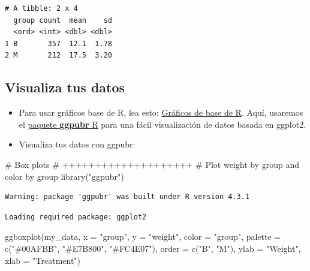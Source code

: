\documentclass[
  letterpaper,
  DIV=11,
  numbers=noendperiod]{scrartcl}
\newenvironment{Shaded}{\begin{snugshade}}{\end{snugshade}}
\newcommand{\AttributeTok}[1]{\textcolor[rgb]{0.40,0.45,0.13}{#1}}
\newcommand{\CommentTok}[1]{\textcolor[rgb]{0.37,0.37,0.37}{#1}}
\newcommand{\FunctionTok}[1]{\textcolor[rgb]{0.28,0.35,0.67}{#1}}
\newcommand{\NormalTok}[1]{\textcolor[rgb]{0.00,0.23,0.31}{#1}}
\newcommand{\StringTok}[1]{\textcolor[rgb]{0.13,0.47,0.30}{#1}}
\begin{document}
\begin{verbatim}
# A tibble: 2 x 4
  group count  mean    sd
  <ord> <int> <dbl> <dbl>
1 B       357  12.1  1.78
2 M       212  17.5  3.20
\end{verbatim}

\hypertarget{visualiza-tus-datos}{%
\subsection{Visualiza tus datos}\label{visualiza-tus-datos}}

\begin{itemize}
\item
  Para usar gráficos base de R, lea esto:
  \href{http://www.sthda.com/english/wiki/r-base-graphs}{Gráficos de
  base de R}. Aquí, usaremos el
  \href{http://www.sthda.com/english/wiki/ggpubr-r-package-ggplot2-based-publication-ready-plots}{paquete
  \textbf{ggpubr} R} para una fácil visualización de datos basada en
  ggplot2.
\item
  Visualiza tus datos con ggpubr:
\end{itemize}

\begin{Shaded}
\begin{Highlighting}[]
\CommentTok{\# Box plots}
\CommentTok{\# ++++++++++++++++++++}
\CommentTok{\# Plot weight by group and color by group}
\FunctionTok{library}\NormalTok{(}\StringTok{"ggpubr"}\NormalTok{)}
\end{Highlighting}
\end{Shaded}

\begin{verbatim}
Warning: package 'ggpubr' was built under R version 4.3.1
\end{verbatim}

\begin{verbatim}
Loading required package: ggplot2
\end{verbatim}

\begin{Shaded}
\begin{Highlighting}[]
\FunctionTok{ggboxplot}\NormalTok{(my\_data, }\AttributeTok{x =} \StringTok{"group"}\NormalTok{, }\AttributeTok{y =} \StringTok{"weight"}\NormalTok{, }
          \AttributeTok{color =} \StringTok{"group"}\NormalTok{, }\AttributeTok{palette =} \FunctionTok{c}\NormalTok{(}\StringTok{"\#00AFBB"}\NormalTok{, }\StringTok{"\#E7B800"}\NormalTok{, }\StringTok{"\#FC4E07"}\NormalTok{),}
          \AttributeTok{order =} \FunctionTok{c}\NormalTok{(}\StringTok{"B"}\NormalTok{, }\StringTok{"M"}\NormalTok{),}
          \AttributeTok{ylab =} \StringTok{"Weight"}\NormalTok{, }\AttributeTok{xlab =} \StringTok{"Treatment"}\NormalTok{)}
\end{Highlighting}
\end{Shaded}
\end{document}
